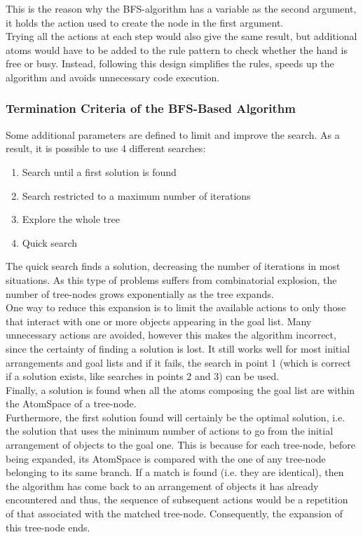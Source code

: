 This is the reason why the BFS-algorithm has a variable as the second argument, it holds the action used to create the node in the first argument. \\
Trying all the actions at each step would also give the same result, but additional atoms would have to be added to the rule pattern to check whether the hand is free or busy.
Instead, following this design simplifies the rules, speeds up the algorithm and avoids unnecessary code execution.


\subsubsection{Termination Criteria of the BFS-Based Algorithm}\label{sec:term_criteria}

Some additional parameters are defined to limit and improve the search. As a result, it is possible to use 4 different searches:

\begin{enumerate}
	\item Search until a first solution is found
	\item Search restricted to a maximum number of iterations 
	\item Explore the whole tree
	\item Quick search
\end{enumerate}

The quick search finds a solution, decreasing the number of iterations in most situations.
As this type of problems suffers from combinatorial explosion\footnotemark{}, the number of tree-nodes grows exponentially as the tree expands.
 \\
One way to reduce this expansion is to limit the available actions to only those that interact with one or more objects appearing in the goal list.
Many unnecessary actions are avoided, however this makes the algorithm incorrect, since the certainty of finding a solution is lost.
It still works well for most initial arrangements and goal lists and if it fails, the search in point 1 (which is correct if a solution exists, like searches in points 2 and 3) can be used. \\

Finally, a solution is found when all the atoms composing the goal list are within the AtomSpace of a tree-node. \\
Furthermore, the first solution found will certainly be the optimal solution, i.e. the solution that uses the minimum number of actions to go from the initial arrangement of objects to the goal one.
This is because for each tree-node, before being expanded, its AtomSpace is compared with the one of any tree-node belonging to its same branch.
If a match is found (i.e. they are identical), then the algorithm has come back to an arrangement of objects it has already encountered and thus, the sequence of subsequent actions would be a repetition of that associated with the matched tree-node. Consequently, the expansion of this tree-node ends.


